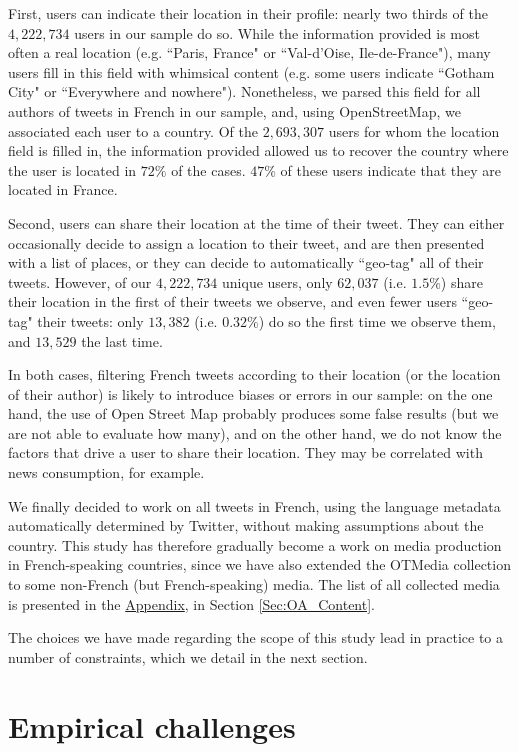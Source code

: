 First, users can indicate their location in their profile: nearly two thirds of the $4,222,734 $ users in our sample do so. While the information provided is most often a real location (e.g. ``Paris, France" or ``Val-d'Oise, Ile-de-France"), many users fill in this field with whimsical content (e.g. some users indicate ``Gotham City" or ``Everywhere and nowhere"). Nonetheless, we parsed this field for all authors of tweets in French in our sample, and, using OpenStreetMap, we associated each user to a country. Of the $2,693,307$ users for whom the location field is filled in, the information provided allowed us to recover the country where the user is located in $72\%$ of the cases. $47\%$ of these users indicate that they are located in France.

Second, users can share their location at the time of their tweet. They can either occasionally decide to assign a location to their tweet, and are then presented with a list of places, or they can decide to automatically ``geo-tag"  all of their tweets. However, of our $4,222,734 $ unique users, only $62,037$ (i.e. $1.5\%$) share their location in the first of their tweets we observe, and even fewer users ``geo-tag" their tweets: only $ 13,382$ (i.e. $0.32\%$) do so the first time we observe them, and $13,529$ the last time.

In both cases, filtering French tweets according to their location (or the location of their author) is likely to introduce biases or errors in our sample: on the one hand, the use of Open Street Map probably produces some false results (but we are not able to evaluate how many), and on the other hand, we do not know the factors that drive a user to share their location. They may be correlated with news consumption, for example.

We finally decided to work on all tweets in French, using the language metadata automatically determined by Twitter, without making assumptions about the country. This study has therefore gradually become a work on media production in French-speaking countries, since we have also extended the OTMedia collection to some  non-French (but French-speaking) media. The list of all collected media is presented in the \hyperlink{ref:Appendix}{Appendix}, in Section \ref{Sec:OA_Content}.

The choices we have made regarding the scope of this study lead in practice to a number of constraints, which we detail in the next section.

\section{Empirical challenges}

